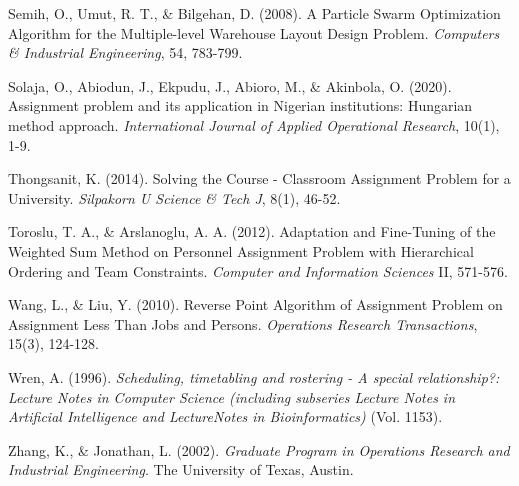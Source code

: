 \documentclass[11pt]{report}
\begin{document}
\begin{description}
		\item Semih, O., Umut, R. T., \& Bilgehan, D. (2008). A Particle Swarm Optimization Algorithm for the
		Multiple-level Warehouse Layout Design Problem. \emph{Computers \& Industrial Engineering},
		54, 783-799.
		
		\item Solaja, O., Abiodun, J., Ekpudu, J., Abioro, M., \& Akinbola, O. (2020). Assignment problem and
		its application in Nigerian institutions: Hungarian method approach. \emph{International Journal
		of Applied Operational Research}, 10(1), 1-9.
		
		\item Thongsanit, K. (2014). Solving the Course - Classroom Assignment Problem for a University.
		\emph{Silpakorn U Science \& Tech J}, 8(1), 46-52.
		
		\item Toroslu, T. A., \& Arslanoglu, A. A. (2012). Adaptation and Fine-Tuning of the Weighted Sum
		Method on Personnel Assignment Problem with Hierarchical Ordering and Team Constraints. \emph{Computer and Information Sciences} II, 571-576.
		
		\item Wang, L., \& Liu, Y. (2010). Reverse Point Algorithm of Assignment Problem on Assignment Less Than Jobs and Persons. \emph{Operations Research Transactions}, 15(3), 124-128.
		
		\item Wren, A. (1996). \emph{Scheduling, timetabling and rostering - A special relationship?: Lecture Notes
		in Computer Science (including subseries Lecture Notes in Artificial Intelligence and
		LectureNotes in Bioinformatics)} (Vol. 1153).
		
		\item Zhang, K., \& Jonathan, L. (2002). \emph{Graduate Program in Operations Research and Industrial Engineering}. The University of Texas, Austin.
	\end{description}
	
\end{document}

